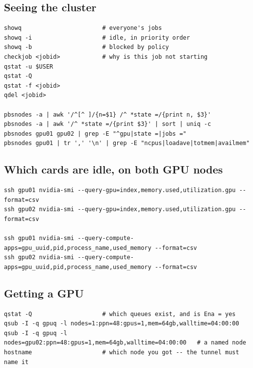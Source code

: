 \documentclass[11pt,a4paper]{article}
\begin{document}
\subsection{Seeing the cluster}
\begin{lstlisting}
showq                       # everyone's jobs
showq -i                    # idle, in priority order
showq -b                    # blocked by policy
checkjob <jobid>            # why is this job not starting
qstat -u $USER
qstat -Q
qstat -f <jobid>
qdel <jobid>

pbsnodes -a | awk '/^[^ ]/{n=$1} /^ *state =/{print n, $3}'
pbsnodes -a | awk '/^ *state =/{print $3}' | sort | uniq -c
pbsnodes gpu01 gpu02 | grep -E "^gpu|state =|jobs ="
pbsnodes gpu01 | tr ',' '\n' | grep -E "ncpus|loadave|totmem|availmem"
\end{lstlisting}

\subsection{Which cards are idle, on both GPU nodes}
\begin{lstlisting}
ssh gpu01 nvidia-smi --query-gpu=index,memory.used,utilization.gpu --format=csv
ssh gpu02 nvidia-smi --query-gpu=index,memory.used,utilization.gpu --format=csv

ssh gpu01 nvidia-smi --query-compute-apps=gpu_uuid,pid,process_name,used_memory --format=csv
ssh gpu02 nvidia-smi --query-compute-apps=gpu_uuid,pid,process_name,used_memory --format=csv
\end{lstlisting}

\subsection{Getting a GPU}
\begin{lstlisting}
qstat -Q                    # which queues exist, and is Ena = yes
qsub -I -q gpuq -l nodes=1:ppn=48:gpus=1,mem=64gb,walltime=04:00:00
qsub -I -q gpuq -l nodes=gpu02:ppn=48:gpus=1,mem=64gb,walltime=04:00:00   # a named node
hostname                    # which node you got -- the tunnel must name it
\end{lstlisting}
\end{document}

